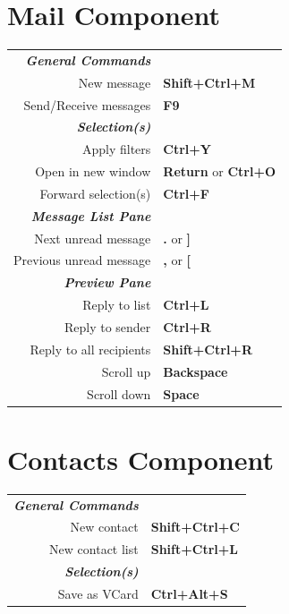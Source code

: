\documentclass[12pt]{article}
\begin{document}
\begin{landscape}
\begin{center}
\begin{multicols}{2}
	\section*{Mail Component}
	\begin{tabular*}{4in}{rp{1.5in}}
		\textit{\textbf{General Commands}}	&				\\
		New message				& \textbf{Shift+Ctrl+M}		\\
		\vspace{1.5mm}
		Send/Receive messages			& \textbf{F9}			\\
		\textit{\textbf{Selection(s)}}		&				\\
		Apply filters				& \textbf{Ctrl+Y}		\\
		Open in new window 			& \textbf{Return} or \textbf{Ctrl+O}	\\
		\vspace{1.5mm}
		Forward selection(s)			& \textbf{Ctrl+F}		\\
		\textit{\textbf{Message List Pane}}	&				\\
		Next unread message			& \textbf{.} or \textbf{]}	\\
		\vspace{1.5mm}
		Previous unread message			& \textbf{,} or \textbf{[}	\\
		\textit{\textbf{Preview Pane}}		&				\\
		Reply to list				& \textbf{Ctrl+L}		\\
		Reply to sender				& \textbf{Ctrl+R}		\\
		Reply to all recipients 		& \textbf{Shift+Ctrl+R}		\\
		Scroll up				& \textbf{Backspace}		\\
		Scroll down				& \textbf{Space}		\\
	\end{tabular*}
	\section*{Contacts Component}
	\begin{tabular*}{4in}{rp{1.5in}}
		\textit{\textbf{General Commands}}	&				\\
		New contact				& \textbf{Shift+Ctrl+C}		\\
		\vspace{1.5mm}
		New contact list			& \textbf{Shift+Ctrl+L}		\\
		\textit{\textbf{Selection(s)}}		&				\\
		Save as VCard				& \textbf{Ctrl+Alt+S}		\\
	\end{tabular*}
	\end{multicols}
	\end{center}
	\end{landscape}
 
\end{document}
